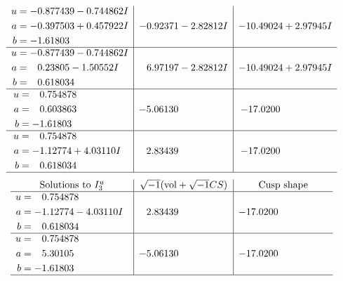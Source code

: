 \documentclass[1p]{elsarticle_modified}
\theoremstyle{definition}
\newcommand{\I}{\sqrt{-1}}
\begin{document}
$$\begin{array}{c|c|c}
\begin{aligned}
u &= -0.877439 - 0.744862 I \\
a &= -0.397503 + 0.457922 I \\
b &= -1.61803\phantom{ +0.000000I}\end{aligned}
 & -0.92371 - 2.82812 I & -10.49024 + 2.97945 I \\ \hline\begin{aligned}
u &= -0.877439 - 0.744862 I \\
a &= \phantom{-}0.23805 - 1.50552 I \\
b &= \phantom{-}0.618034\phantom{ +0.000000I}\end{aligned}
 & \phantom{-}6.97197 - 2.82812 I & -10.49024 + 2.97945 I \\ \hline\begin{aligned}
u &= \phantom{-}0.754878\phantom{ +0.000000I} \\
a &= \phantom{-}0.603863\phantom{ +0.000000I} \\
b &= -1.61803\phantom{ +0.000000I}\end{aligned}
 & -5.06130\phantom{ +0.000000I} & -17.0200\phantom{ +0.000000I} \\ \hline\begin{aligned}
u &= \phantom{-}0.754878\phantom{ +0.000000I} \\
a &= -1.12774 + 4.03110 I \\
b &= \phantom{-}0.618034\phantom{ +0.000000I}\end{aligned}
 & \phantom{-}2.83439\phantom{ +0.000000I} & -17.0200\phantom{ +0.000000I}\\
 \hline 
 \end{array}$$\newpage$$\begin{array}{c|c|c}  
\text{Solutions to }I^u_{3}& \I (\text{vol} + \sqrt{-1}CS) & \text{Cusp shape}\\
 \hline 
\begin{aligned}
u &= \phantom{-}0.754878\phantom{ +0.000000I} \\
a &= -1.12774 - 4.03110 I \\
b &= \phantom{-}0.618034\phantom{ +0.000000I}\end{aligned}
 & \phantom{-}2.83439\phantom{ +0.000000I} & -17.0200\phantom{ +0.000000I} \\ \hline\begin{aligned}
u &= \phantom{-}0.754878\phantom{ +0.000000I} \\
a &= \phantom{-}5.30105\phantom{ +0.000000I} \\
b &= -1.61803\phantom{ +0.000000I}\end{aligned}
 & -5.06130\phantom{ +0.000000I} & -17.0200\phantom{ +0.000000I}\\
 \hline 
 \end{array}$$\newpage\newpage\renewcommand{\arraystretch}{1}
\end{document}
